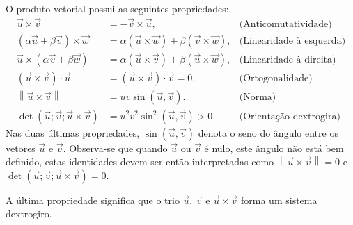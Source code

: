 O produto vetorial possui as seguintes propriedades:
\begin{subequations}\label{propprodvec}
\begin{align}
\vec{u}\times\vec{v}&=-\vec{v}\times\vec{u},&\text{(Anticomutatividade)}\label{propprodvecanticom}\\
\left(\alpha \vec{u}+ \beta\vec{v}\right)\times\vec{w}&=\alpha\left(\vec{u}\times\vec{w}\right)+\beta\left(\vec{v}\times\vec{w}\right),&\text{(Linearidade à esquerda)}\label{propprodveclin1}\\
\vec{u}\times\left(\alpha \vec{v}+ \beta\vec{w}\right)&=\alpha\left(\vec{u}\times\vec{v}\right)+\beta\left(\vec{u}\times\vec{w}\right),&\text{(Linearidade à direita)}\label{propprodveclin2}\\
\left(\vec{u}\times \vec{v}\right)\cdot \vec{u}&=\left(\vec{u}\times \vec{v}\right)\cdot \vec{v}=0,&\text{(Ortogonalidade)}\label{propprodvecorto}\\
\left\|\vec{u}\times \vec{v}\right\|&=uv\sin(\vec{u},\vec{v})
.&\text{(Norma)}\label{propprodvecnorma}\\
\det\left(\vec{u}; \vec{v};\vec{u}\times \vec{v}\right)&=u^2v^2\sin^2(\vec{u},\vec{v})>0
.&\text{(Orientação dextrogira)}\label{propprodvecorient}
\end{align}
\end{subequations}
Nas duas últimas propriedades, $\sin(\vec{u},\vec{v})$ denota o seno do ângulo entre os vetores $\vec{u}$ e $\vec{v}$. Observa-se que quando $\vec{u}$ ou $\vec{v}$ é nulo, este ângulo não está bem definido, estas identidades devem ser então interpretadas como $\left\|\vec{u}\times \vec{v}\right\|=0$ e $\det\left(\vec{u}; \vec{v};\vec{u}\times \vec{v}\right)=0$.

A última propriedade significa que o trio $\vec{u}$, $\vec{v}$ e $\vec{u}\times\vec{v}$ forma um sistema dextrogiro.

